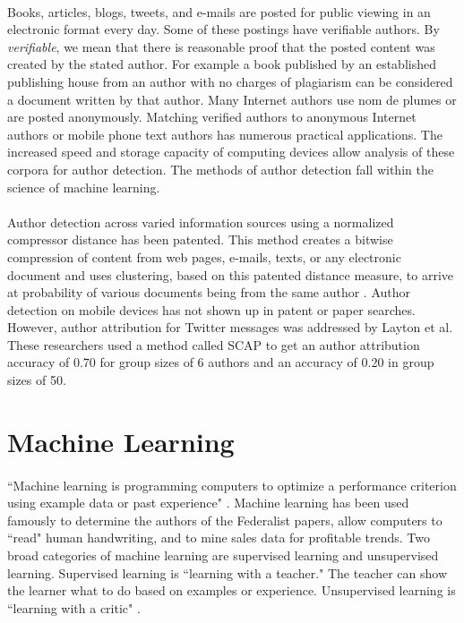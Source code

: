 	\paragraph{} Books, articles, blogs, tweets, and e-mails are posted for public viewing in an electronic format every day.  Some of these postings have verifiable authors.  By \emph{verifiable}, we mean that there is reasonable proof that the posted content was created by the stated author.  For example a book published by an established publishing house from an author with no charges of plagiarism can be considered a document written by that author. Many Internet authors use nom de plumes or are posted anonymously.  Matching verified authors to anonymous Internet authors or mobile phone text authors has numerous practical applications. The increased speed and storage capacity of computing devices allow analysis of these corpora for author detection. The methods of author detection fall within the science of machine learning.

\paragraph{} Author detection across varied information sources using a normalized compressor distance has been patented.  This method creates a bitwise compression of content from web pages, e-mails, texts, or any electronic document and uses clustering, based on this patented distance measure, to arrive at probability of various  documents being from the same author \cite{_method_2010}.  Author detection on mobile devices has not shown up in patent or paper searches.  However, author attribution for Twitter messages was addressed by Layton et al. These researchers used a method called SCAP to get an author attribution accuracy of 0.70 for group sizes of 6 authors and an accuracy of 0.20 in group sizes of 50\cite{layton_authorship_2010}.

\section {Machine Learning}
	\paragraph{}``Machine learning is programming computers to optimize a performance criterion using example data or past experience" \cite{alpaydin_introduction_2004}.  Machine learning has been used famously to determine the authors of the Federalist papers, allow computers to ``read" human handwriting, and to mine sales data for profitable trends.  Two broad categories of machine learning are supervised learning and unsupervised learning.  Supervised learning is ``learning with a teacher."  The teacher can show the learner what to do based on examples or experience. Unsupervised learning is ``learning with a critic" \cite{alpaydin_introduction_2004}. 
